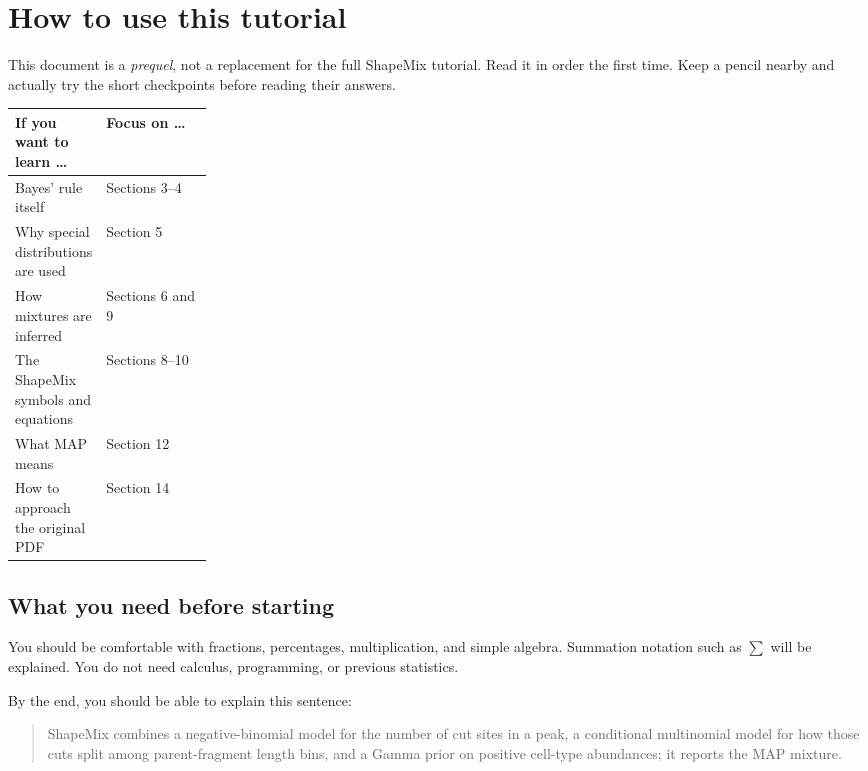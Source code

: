\documentclass[11pt]{article}
\begin{document}
\hypersetup{pageanchor=true}
\setcounter{tocdepth}{1}
\tableofcontents
\newpage
{}

\section{How to use this tutorial}

This document is a \emph{prequel}, not a replacement for the full ShapeMix
tutorial. Read it in order the first time. Keep a pencil nearby and actually try
the short checkpoints before reading their answers.

\begin{center}
\begin{tabularx}{0.94\linewidth}{L{0.23\linewidth}X}
\toprule
If you want to learn \ldots & Focus on \ldots \\
\midrule
Bayes' rule itself & Sections 3--4 \\
Why special distributions are used & Section 5 \\
How mixtures are inferred & Sections 6 and 9 \\
The ShapeMix symbols and equations & Sections 8--10 \\
What MAP means & Section 12 \\
How to approach the original PDF & Section 14 \\
\bottomrule
\end{tabularx}
\end{center}

\subsection{What you need before starting}

You should be comfortable with fractions, percentages, multiplication, and simple
algebra. Summation notation such as \(\sum\) will be explained. You do not need
calculus, programming, or previous statistics.

\begin{checkpoint}
By the end, you should be able to explain this sentence:

\begin{quote}
ShapeMix combines a negative-binomial model for the number of cut sites in a peak,
a conditional multinomial model for how those cuts split among parent-fragment
length bins, and a Gamma prior on positive cell-type abundances; it reports the
MAP mixture.
\end{quote}
\end{checkpoint}
\end{document}
